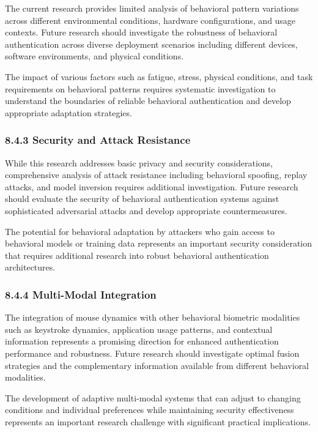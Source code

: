 \documentclass[
  11pt,
  a4paper,
]{article}
\begin{document}
The current research provides limited analysis of behavioral pattern
variations across different environmental conditions, hardware
configurations, and usage contexts. Future research should investigate
the robustness of behavioral authentication across diverse deployment
scenarios including different devices, software environments, and
physical conditions.

The impact of various factors such as fatigue, stress, physical
conditions, and task requirements on behavioral patterns requires
systematic investigation to understand the boundaries of reliable
behavioral authentication and develop appropriate adaptation strategies.

\subsubsection{8.4.3 Security and Attack
Resistance}\label{security-and-attack-resistance}

While this research addresses basic privacy and security considerations,
comprehensive analysis of attack resistance including behavioral
spoofing, replay attacks, and model inversion requires additional
investigation. Future research should evaluate the security of
behavioral authentication systems against sophisticated adversarial
attacks and develop appropriate countermeasures.

The potential for behavioral adaptation by attackers who gain access to
behavioral models or training data represents an important security
consideration that requires additional research into robust behavioral
authentication architectures.

\subsubsection{8.4.4 Multi-Modal
Integration}\label{multi-modal-integration}

The integration of mouse dynamics with other behavioral biometric
modalities such as keystroke dynamics, application usage patterns, and
contextual information represents a promising direction for enhanced
authentication performance and robustness. Future research should
investigate optimal fusion strategies and the complementary information
available from different behavioral modalities.

The development of adaptive multi-modal systems that can adjust to
changing conditions and individual preferences while maintaining
security effectiveness represents an important research challenge with
significant practical implications.
\end{document}
